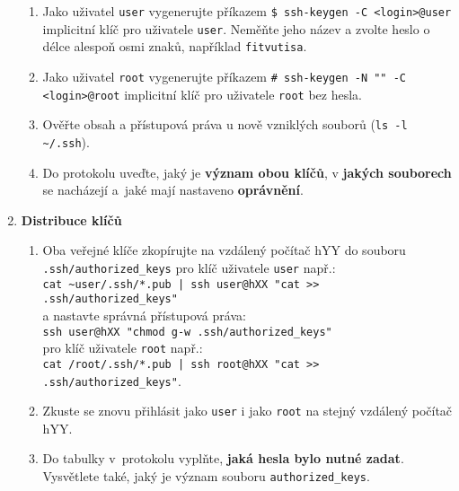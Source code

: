 \documentclass[a4paper,11pt]{article}
\begin{document}
\begin{enumerate}
    \begin{enumerate}

      \item Jako uživatel {\tt user} vygenerujte příkazem \verb|$ ssh-keygen -C <login>@user|
        implicitní klíč pro uživatele
        {\tt user}. Neměňte jeho
        název a zvolte heslo o délce alespoň osmi znaků, například
        \texttt{fitvutisa}.

      \item Jako uživatel {\tt root} vygenerujte příkazem \verb|# ssh-keygen -N "" -C <login>@root|
        implicitní klíč pro uživatele {\tt root} bez hesla.

      \item Ověřte obsah a přístupová práva u nově vzniklých souborů (\verb|ls -l ~/.ssh|).

      \item Do protokolu uveďte, jaký je \textbf{význam obou klíčů}, v \textbf{jakých souborech} se nacházejí a~jaké mají nastaveno \textbf{oprávnění}.


    \end{enumerate}

  \item {\bf Distribuce klíčů}

    \begin{enumerate}

      \item Oba veřejné klíče zkopírujte na vzdálený počítač hYY do
        souboru \verb|.ssh/authorized_keys|
        pro klíč uživatele {\tt user} např.: \\
        {\verb&cat ~user/.ssh/*.pub | ssh user@hXX "cat >> .ssh/authorized_keys"&}\\
        a nastavte správná přístupová práva:\\
        {\verb&ssh user@hXX "chmod g-w .ssh/authorized_keys"&} \\
        pro klíč uživatele {\tt root} např.: \\
        {\verb&cat /root/.ssh/*.pub | ssh root@hXX "cat >> .ssh/authorized_keys"&}. \\

      \item Zkuste se znovu přihlásit jako \texttt{user} i jako \texttt{root} na stejný vzdálený počítač hYY.

      \item Do tabulky v~protokolu vyplňte, \textbf{jaká hesla bylo nutné zadat}. Vysvětlete také, jaký
      je význam souboru \texttt{authorized\_keys}.


\end{enumerate}
\end{enumerate}
\end{document}
